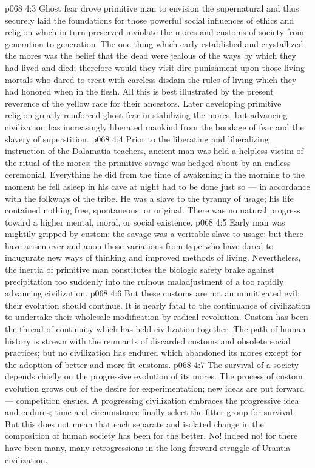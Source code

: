\vs p068 4:3 \pc Ghost fear drove primitive man to envision the supernatural and thus securely laid the foundations for those powerful social influences of ethics and religion which in turn preserved inviolate the mores and customs of society from generation to generation. The one thing which early established and crystallized the mores was the belief that the dead were jealous of the ways by which they had lived and died; therefore would they visit dire punishment upon those living mortals who dared to treat with careless disdain the rules of living which they had honored when in the flesh. All this is best illustrated by the present reverence of the yellow race for their ancestors. Later developing primitive religion greatly reinforced ghost fear in stabilizing the mores, but advancing civilization has increasingly liberated mankind from the bondage of fear and the slavery of superstition.
\vs p068 4:4 Prior to the liberating and liberalizing instruction of the Dalamatia teachers, ancient man was held a helpless victim of the ritual of the mores; the primitive savage was hedged about by an endless ceremonial. Everything he did from the time of awakening in the morning to the moment he fell asleep in his cave at night had to be done just so --- in accordance with the folkways of the tribe. He was a slave to the tyranny of usage; his life contained nothing free, spontaneous, or original. There was no natural progress toward a higher mental, moral, or social existence.
\vs p068 4:5 Early man was mightily gripped by custom; the savage was a veritable slave to usage; but there have arisen ever and anon those variations from type who have dared to inaugurate new ways of thinking and improved methods of living. Nevertheless, the inertia of primitive man constitutes the biologic safety brake against precipitation too suddenly into the ruinous maladjustment of a too rapidly advancing civilization.
\vs p068 4:6 But these customs are not an unmitigated evil; their evolution should continue. It is nearly fatal to the continuance of civilization to undertake their wholesale modification by radical revolution. Custom has been the thread of continuity which has held civilization together. The path of human history is strewn with the remnants of discarded customs and obsolete social practices; but no civilization has endured which abandoned its mores except for the adoption of better and more fit customs.
\vs p068 4:7 The survival of a society depends chiefly on the progressive evolution of its mores. The process of custom evolution grows out of the desire for experimentation; new ideas are put forward --- competition ensues. A progressing civilization embraces the progressive idea and endures; time and circumstance finally select the fitter group for survival. But this does not mean that each separate and isolated change in the composition of human society has been for the better. No! indeed no! for there have been many, many retrogressions in the long forward struggle of Urantia civilization.
